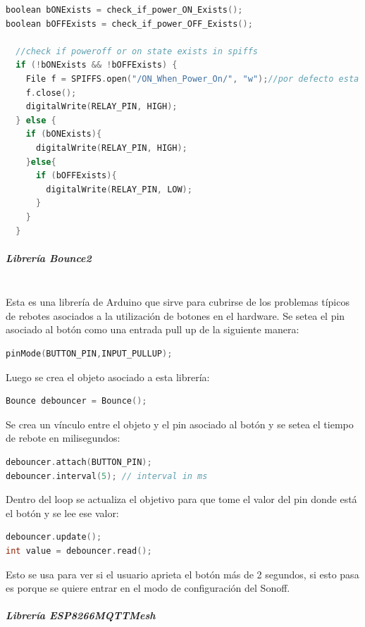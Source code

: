 \begin{lstlisting}[language=C]
boolean bONExists = check_if_power_ON_Exists();
boolean bOFFExists = check_if_power_OFF_Exists();

  //check if poweroff or on state exists in spiffs
  if (!bONExists && !bOFFExists) {
    File f = SPIFFS.open("/ON_When_Power_On/", "w");//por defecto esta ON
    f.close();
    digitalWrite(RELAY_PIN, HIGH);
  } else {
    if (bONExists){
      digitalWrite(RELAY_PIN, HIGH);
    }else{
      if (bOFFExists){
        digitalWrite(RELAY_PIN, LOW);
      }
    }
  }
\end{lstlisting}

\subparagraph{Librería Bounce2}\mbox{}\\
Esta es una librería de Arduino que sirve para cubrirse de los problemas típicos de rebotes asociados a la utilización de botones en el hardware. Se setea el pin asociado al botón como una entrada pull up de la siguiente manera:


\begin{lstlisting}[language=C]
pinMode(BUTTON_PIN,INPUT_PULLUP);
\end{lstlisting}

Luego se crea el objeto asociado a esta librería:

\begin{lstlisting}[language=C]
Bounce debouncer = Bounce();
\end{lstlisting}

Se crea un vínculo entre el objeto y el pin asociado al botón y se setea el tiempo de rebote en milisegundos:

\begin{lstlisting}[language=C]
debouncer.attach(BUTTON_PIN);
debouncer.interval(5); // interval in ms
\end{lstlisting}

Dentro del loop se actualiza el objetivo para que tome el valor del pin donde está el botón y  se lee ese valor:

\begin{lstlisting}[language=C]
debouncer.update();
int value = debouncer.read();
\end{lstlisting}

Esto se usa para ver si el usuario aprieta el botón más de 2 segundos, si esto pasa es porque se quiere entrar en el modo de configuración del Sonoff.

\subparagraph{Librería ESP8266MQTTMesh}\mbox{}\\

